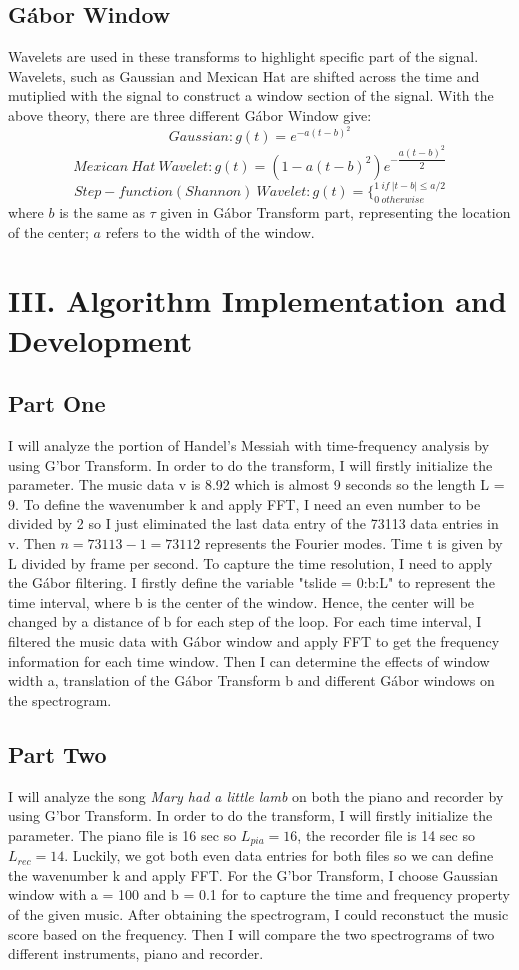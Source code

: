 \documentclass[12pt,letterpaper]{article}
\begin{document}
\subsection*{G\'abor Window}
Wavelets are used in these transforms to highlight specific part of the signal. Wavelets, such as Gaussian and Mexican Hat are shifted across the time and mutiplied with the signal to construct a window section of the signal. With the above theory, there are three different G\'abor Window give:
$$Gaussian: g(t) = e^{-a(t-b)^2}$$
$$Mexican\:Hat\:Wavelet: g(t) = (1-a(t-b)^2)e^{-\dfrac{a(t-b)^2}{2}}$$
$$Step-function(Shannon)\:Wavelet: g(t) = \Bigg\{_{0\:otherwise}^{1\:if\:|t-b|\leq {a/2}}$$
where $b$ is the same as $\tau$ given in G\'abor Transform part, representing the location of the center; $a$ refers to the width of the window. 
\section*{III. Algorithm Implementation and Development}
\subsection*{Part One}
I will analyze the portion of Handel's Messiah with time-frequency analysis by using G\a'bor Transform. In order to do the transform, I will firstly initialize the parameter. The music data v is 8.92 which is almost 9 seconds so the length L = 9. To define the wavenumber k and apply FFT, I need an even number to be divided by 2 so I just eliminated the last data entry of the 73113 data entries in v. Then $n = 73113 - 1 = 73112$ represents the Fourier modes. Time t is given by L divided by frame per second. To capture the time resolution, I need to apply the G\'abor filtering. I firstly define the variable "tslide = 0:b:L" to represent the time interval, where b is the center of the window. Hence, the center will be changed by a distance of b for each step of the loop. For each time interval, I filtered the music data with G\'abor window and apply FFT to get the frequency information for each time window. Then I can determine the effects of window width a, translation  of the G\'abor Transform b and different G\'abor windows on the spectrogram. 
\subsection*{Part Two}
I will analyze the song \textit{Mary had a little lamb} on both the piano and recorder by using G\a'bor Transform. In order to do the transform, I will firstly initialize the parameter. The piano file is 16 sec so $L_{pia} = 16$, the recorder file is 14 sec so $L_{rec} = 14$. Luckily, we got both even data entries for both files so we can define the wavenumber k and apply FFT. For the G\a'bor Transform, I choose Gaussian window with a = 100 and b = 0.1 for to capture the time and frequency property of the given music. After obtaining the spectrogram, I could reconstuct the music score based on the frequency. Then I will compare the two spectrograms of two different instruments, piano and recorder. 
\end{document}
